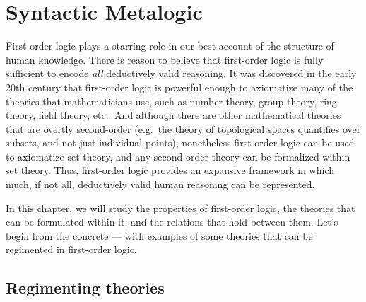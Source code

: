 \chapter{Syntactic Metalogic} \label{ch:syntax}





First-order logic plays a starring role in our best account of the
structure of human knowledge.  There is reason to believe that
first-order logic is fully sufficient to encode \textit{all}
deductively valid reasoning.  It was discovered in the early 20th
century that first-order logic is powerful enough to axiomatize many
of the theories that mathematicians use, such as number theory, group
theory, ring theory, field theory, etc..  And although there are other
mathematical theories that are overtly second-order (e.g.\ the theory
of topological spaces quantifies over subsets, and not just individual
points), nonetheless first-order logic can be used to axiomatize
set-theory, and any second-order theory can be formalized within set
theory.  Thus, first-order logic provides an expansive framework in
which much, if not all, deductively valid human reasoning can be
represented.

In this chapter, we will study the properties of first-order logic,
the theories that can be formulated within it, and the relations that
hold between them.  Let's begin from the concrete --- with examples of
some theories that can be regimented in first-order logic.

\section{Regimenting theories}



